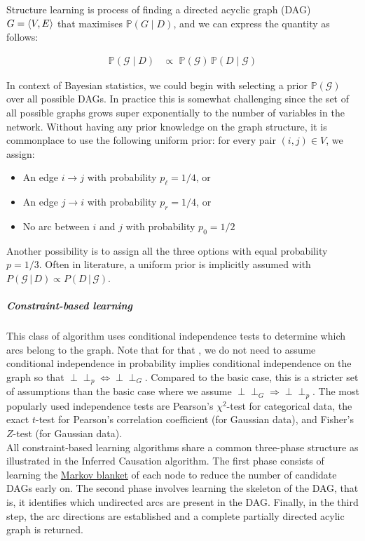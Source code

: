 Structure learning is process of finding a directed acyclic graph (DAG) $G = \braket{V, E}$ that maximises $\mathbb P(G\mid D)$, and we can express the quantity as follows:

\begin{eqnarray*}
\mathbb P(\mathcal G\mid D)
&\propto\,\, \mathbb P(\mathcal G)\,\mathbb P(D\mid \mathcal G)
\end{eqnarray*}

In context of Bayesian statistics, we could begin with selecting a prior $\mathbb P(\mathcal G)$ over all possible DAGs\cite{castelo2000priors}. In practice this is somewhat challenging since the set of all possible graphs grows super exponentially to the number of variables in the network. Without having any prior knowledge on the graph structure, it is commonplace to use the following uniform prior: for every pair $(i, j) \in V$, we assign:

\begin{itemize}
	\item{An edge $i \to j$ with probability $p_\ell=1/4$, or}
	\item{An edge $j \to i$ with probability $p_r =1/4$, or}
	\item{No arc between $i$ and $j$ with probability $p_0 = 1/2$}
\end{itemize}

Another possibility is to assign all the three options with equal probability $p = 1/3$. Often in literature, a uniform prior is implicitly assumed with $P(\mathcal G\,|\, D)\propto P(D\,|\, \mathcal G)$.

\subparagraph{Constraint-based learning}

\label{constraint}

This class of algorithm \cite{scutari2014bayesian} uses conditional independence tests to determine which arcs belong to the graph. Note that for that , we do not need to assume conditional independence in probability implies conditional independence on the graph so that $\perp\!\!\perp_p \Leftrightarrow \perp\!\!\perp_{G}$. Compared to the basic case, this is a stricter set of assumptions than the basic case where we assume $\perp\!\!\perp_G \Rightarrow \perp\!\!\perp_p$. The most popularly used independence tests are Pearson's $\chi^2$-test for categorical data, the exact $t$-test for Pearson's correlation coefficient (for Gaussian data), and Fisher's $Z$-test (for Gaussian data).\\

All constraint-based learning algorithms share a common three-phase structure as illustrated in the Inferred Causation algorithm. The first phase consists of learning the \hyperref[blanky]{Markov blanket} of each node to reduce the number of candidate DAGs early on. The second phase involves learning the skeleton of the DAG, that is, it identifies which undirected arcs are present in the DAG. Finally, in the third step, the arc directions are established and a complete partially directed acylic graph is returned. \\

